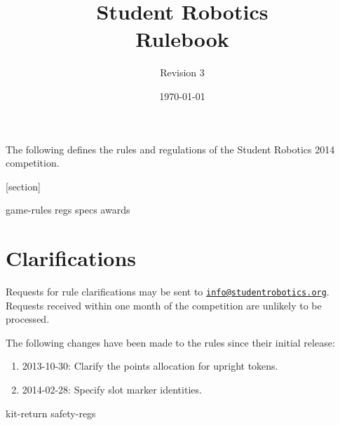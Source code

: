 \documentclass[a4paper, 11pt]{scrartcl}
\title {Student Robotics \sryear\\ Rulebook}
\author{Revision 3}
\date{\today}
\newcommand{\sryear}{2014}
\begin{document}
\maketitle

\noindent The following defines the rules and regulations of the Student Robotics \sryear {} competition.

[section]
\newcommand{\rcn}{\stepcounter{rule}\arabic{section}.\arabic{rule}}
\renewcommand{\labelenumi}{\rcn}

 {game-rules}
\newpage
 {regs}
\newpage
 {specs}
\newpage
 {awards}

\renewcommand{\labelenumi}{\rcn}

\section{Clarifications}
Requests for rule clarifications may be sent to \href{mailto:info@studentrobotics.org}{\nolinkurl{info@studentrobotics.org}}.
Requests received within one month of the competition are unlikely to be processed.

The following changes have been made to the rules since their initial release:

\begin{enumerate}
  \item 2013-10-30: Clarify the points allocation for upright tokens.
  \item 2014-02-28: Specify slot marker identities.
\end{enumerate}

\newpage
\appendix
\appendixpage
\addappheadtotoc
 {kit-return}
 {safety-regs}
\end{document}
